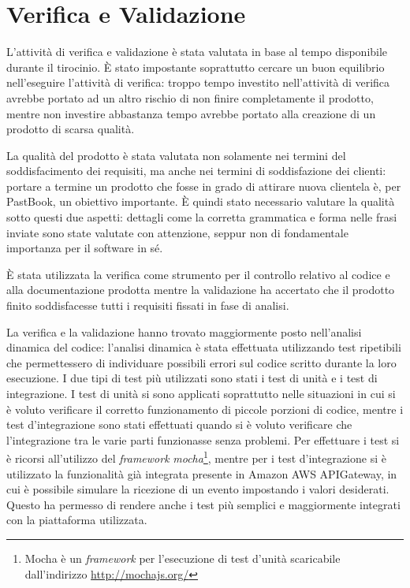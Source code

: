 
\chapter{Verifica e Validazione}

L'attività di verifica e validazione è stata valutata in base al tempo
disponibile durante il tirocinio. È stato impostante soprattutto cercare un
buon equilibrio nell'eseguire l'attività di verifica: troppo tempo investito
nell'attività di verifica avrebbe portato ad un altro rischio di non finire
completamente il prodotto, mentre non investire abbastanza tempo avrebbe
portato alla creazione di un prodotto di scarsa qualità.

La qualità del prodotto è stata valutata non solamente nei termini del
soddisfacimento dei requisiti, ma anche nei termini di soddisfazione dei
clienti: portare a termine un prodotto che fosse in grado di attirare nuova
clientela è, per PastBook, un obiettivo importante. È quindi stato necessario
valutare la qualità sotto questi due aspetti: dettagli come la corretta
grammatica e forma  nelle frasi inviate sono state valutate con attenzione,
seppur non di fondamentale importanza per il software in sé.

È stata utilizzata la verifica come strumento per il controllo relativo
al codice e alla documentazione prodotta mentre la validazione ha accertato
che il prodotto finito soddisfacesse tutti i requisiti fissati in fase di
analisi.

La verifica e la validazione hanno trovato maggiormente posto nell'analisi
dinamica del codice: l'analisi dinamica è stata effettuata utilizzando test
ripetibili che permettessero di individuare possibili errori sul codice
scritto durante la loro esecuzione.
I due tipi di test più utilizzati sono stati i test di unità e i test di
integrazione.
I test di unità si sono applicati soprattutto nelle situazioni in cui si è
voluto verificare il corretto funzionamento di piccole porzioni di codice,
mentre i test d'integrazione sono stati effettuati quando si è voluto
verificare che l'integrazione tra le varie parti funzionasse senza problemi.
Per effettuare i test si è ricorsi all'utilizzo del \textit{framework}
\textit{mocha}\footnote{Mocha è un \textit{framework} per l'esecuzione di test
d'unità scaricabile dall'indirizzo \url{http://mochajs.org/}}, mentre per i
test d'integrazione si è utilizzato la funzionalità già integrata presente in
Amazon AWS APIGateway, in cui è possibile simulare la ricezione di un evento
impostando i valori desiderati. Questo ha permesso di rendere anche i test più
semplici e maggiormente integrati con la piattaforma utilizzata.

